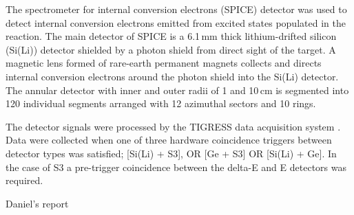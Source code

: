 The spectrometer for internal conversion electrons (SPICE) detector was used to detect internal conversion electrons emitted from excited states populated in the reaction. The main detector of SPICE is a 6.1\,mm thick lithium-drifted silicon (Si(Li)) detector shielded by a photon shield from direct sight of the target. A magnetic lens formed of rare-earth permanent magnets collects and directs internal conversion electrons around the photon shield into the Si(Li) detector. The annular detector with inner and outer radii of 1 and 10\,cm is segmented into 120 individual segments arranged with 12 azimuthal sectors and 10 rings.

The detector signals were processed by the TIGRESS data acquisition system \cite{Martin08}. Data were collected when one of three hardware coincidence triggers between detector types was satisfied; [Si(Li) + S3], OR [Ge + S3] OR [Si(Li) + Ge]. In the case of S3 a pre-trigger coincidence between the delta-E and E detectors was required.

Daniel's report

